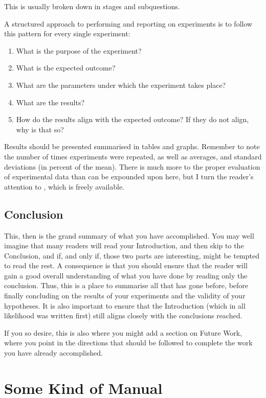 \documentclass[ twoside,openright,titlepage,numbers=noenddot,headinclude,%
                footinclude=true,cleardoublepage=empty,abstractoff, %
                BCOR=5mm,paper=a4,fontsize=11pt,%
                ngerman,american,%
                ]{scrreprt}
\begin{document}
This is usually broken down in stages and subquestions.

A structured approach to performing and reporting on experiments is
to follow this pattern for every single experiment:

\begin{enumerate}
\item What is the purpose of the experiment?
\item What is the expected outcome?
\item What are the parameters under which the experiment takes place?
\item What are the results?
\item How do the results align with the expected outcome? If they do
  not align, why is that so?
\end{enumerate}

Results should be presented summarised in tables and graphs.  Remember
to note the number of times experiments were repeated, as well as
averages, and standard deviations (in percent of the mean).  There is
much more to the proper evaluation of experimental data than can be
expounded upon here, but I turn the reader's attention to
\citep{Downey2011:TSPASFP2011}, which is freely available.


\chapter{Conclusion}
\label{cha:conclusion}

This, then is the grand summary of what you have accomplished.  You
may well imagine that many readers will read your Introduction, and
then skip to the Conclusion, and if, and only if, those two parts are
interesting, might be tempted to read the rest. A consequence is that
you should ensure that the reader will gain a good overall
understanding of what you have done by reading only the conclusion.
Thus, this is a place to summarise all that has gone before, before
finally concluding on the results of your experiments and the validity
of your hypotheses. It is also important to ensure that the
Introduction (which in all likelihood was written first) still aligns
closely with the conclusions reached.

If you so desire, this is also where you might add a section on Future
Work, where you point in the directions that should be followed to
complete the work you have already accomplished.



\part{Some Kind of Manual}

\cleardoublepage
\end{document}
